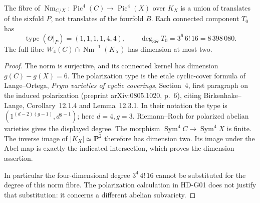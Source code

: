 \begin{proposition}
\label{HD-G03}
The fibre of $\operatorname{Nm}_{C/X}:\operatorname{Pic}^4(C)
\to\operatorname{Pic}^4(X)$ over $K_X$ is a union of translates of the
sixfold $P$, not translates of the fourfold $B$. Each connected
component $T_0$ has
\[
 \operatorname{type}(\Theta|_P)=(1,1,1,1,4,4),\qquad
 \deg_{3\Theta}T_0=3^6\,6!\,16=8\,398\,080.
\]
The full fibre $W_4(C)\cap\operatorname{Nm}^{-1}(K_X)$ has dimension
at most two.
\end{proposition}
\begin{proof}
The norm is surjective, and its connected kernel has dimension
$g(C)-g(X)=6$. The polarization type is the etale cyclic-cover
formula of Lange--Ortega, \emph{Prym varieties of cyclic coverings},
Section~4, first paragraph on the induced polarization (preprint
arXiv:0805.1020, p.~6), citing Birkenhake--Lange, Corollary~12.1.4 and
Lemma~12.3.1. In their notation the type is
$(1^{(d-2)(g-1)},d^{g-1})$; here $d=4,g=3$.
Riemann--Roch for polarized abelian varieties gives the displayed
degree. The morphism $\operatorname{Sym}^4 C\to\operatorname{Sym}^4 X$
is finite. The inverse image of $|K_X|\simeq\mathbf P^2$ therefore
has dimension two. Its image under the Abel map is exactly the
indicated intersection, which proves the dimension assertion.

In particular the four-dimensional degree
$3^4\,4!\,16$ cannot be substituted for the degree of this norm fibre.
The polarization calculation in HD-G01 does not justify that
substitution: it concerns a different abelian subvariety.
\end{proof}

